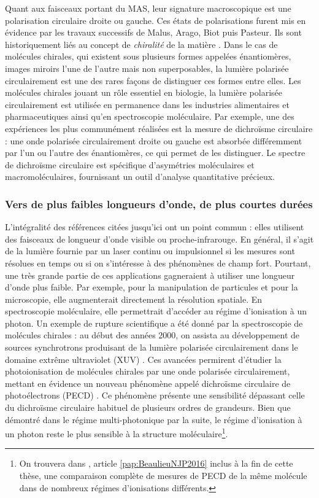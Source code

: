 Quant aux faisceaux portant du MAS, leur signature macroscopique est une polarisation circulaire droite ou gauche. Ces états de polarisations furent mis en évidence par les travaux successifs de Malus, Arago, Biot puis Pasteur. Ils sont historiquement liés au concept de \textit{chiralité} de la matière . Dans le cas de molécules chirales, qui existent sous plusieurs formes appelées énantiomères, images miroirs l'une de l'autre mais non superposables, la lumière polarisée circulairement est une des rares façons de distinguer ces formes entre elles. Les molécules chirales jouant un rôle essentiel en biologie, la lumière polarisée circulairement est utilisée en permanence dans les industries alimentaires et pharmaceutiques ainsi qu'en spectroscopie moléculaire. Par exemple, une des expériences les plus communément réalisées est la mesure de dichroïsme circulaire : une onde polarisée circulairement droite ou gauche est absorbée différemment par l'un ou l'autre des énantiomères, ce qui permet de les distinguer. Le spectre de dichroïsme circulaire est spécifique d’asymétries moléculaires et macromoléculaires, fournissant un outil d'analyse quantitative précieux.

\subsubsection{Vers de plus faibles longueurs d'onde, de plus courtes durées}
L'intégralité des références citées jusqu'ici ont un point commun : elles utilisent des faisceaux de longueur d'onde visible ou proche-infrarouge. En général, il s'agit de la lumière fournie par un laser continu ou impulsionnel si les mesures sont résolues en temps ou si on s'intéresse à des phénomènes de champ fort. Pourtant, une très grande partie de ces applications gagneraient à utiliser une longueur d'onde plus faible. Par exemple, pour la manipulation de particules et pour la microscopie, elle augmenterait directement la résolution spatiale. En spectroscopie moléculaire, elle permettrait d'accéder au régime d'ionisation à un photon. Un exemple de rupture scientifique a été donné par la spectroscopie de molécules chirales : au début des années 2000, on assista au développement de sources synchrotrons produisant de la lumière polarisée circulairement dans le domaine extrême ultraviolet (XUV) . Ces avancées permirent d'étudier la photoionisation de molécules chirales par une onde polarisée circulairement, mettant en évidence un nouveau phénomène appelé dichroïsme circulaire de photoélectrons (PECD) . Ce phénomène présente une sensibilité dépassant celle du dichroïsme circulaire habituel de plusieurs ordres de grandeurs. Bien que démontré dans le régime multi-photonique par la suite, le régime d'ionisation à un photon reste le plus sensible à la structure moléculaire\footnote{On trouvera dans , article \ref{pap:BeaulieuNJP2016} inclus à la fin de cette thèse, une comparaison complète de mesures de PECD de la même molécule dans de nombreux régimes d'ionisations différents.}.

